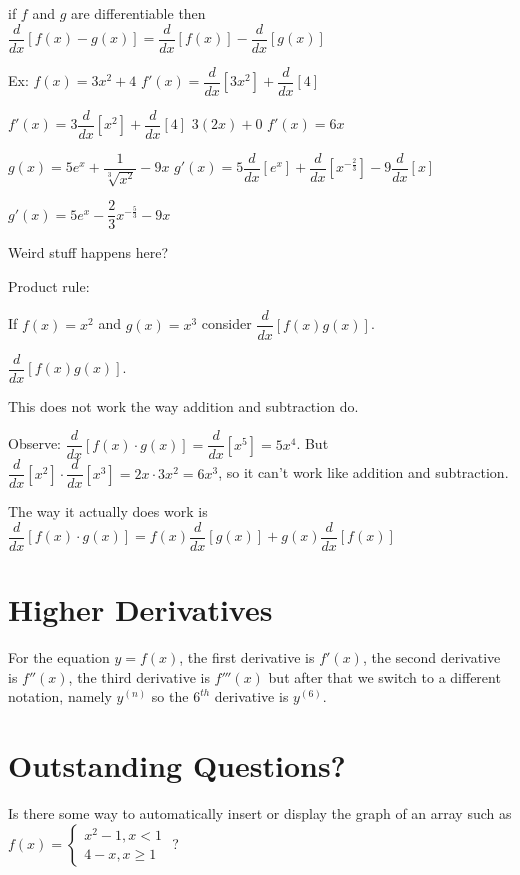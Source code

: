 \documentclass[12pt]{article}
\begin{document}
if $f$ and $g$ are differentiable then $\dfrac{d}{dx} \left[ f(x)-g(x) \right] =  \dfrac{d}{dx} \left[ f(x)
\right] - \dfrac{d}{dx} \left[ g(x) \right]$


Ex: $f(x) = 3x^{2}+4$
$f'(x) = \dfrac{d}{dx} \left[ 3x^{2} \right] + \dfrac{d}{dx} \left[ 4 \right] $

$f'(x) = 3\dfrac{d}{dx} \left[ x^{2} \right] + \dfrac{d}{dx} \left[ 4 \right] $
$3(2x)+0$
$f'(x) = 6x$

$g(x) = 5e^{x} +\dfrac{1}{\sqrt[3]{x^{2}}}-9x$
$g'(x) = 5\dfrac{d}{dx} \left[e^{x} \right] + \dfrac{d}{dx} \left[ x^{-\frac{2}{3}} \right] - 9 \dfrac{d}{dx}
\left[ x\right] $

$g'(x) = 5e^{x} - \dfrac{2}{3}x^{-\frac{5}{3}} - 9x$

Weird stuff happens here?


Product rule:

If $f(x) = x^{2}$ and $g(x)=x^{3}$ consider $\dfrac{d}{dx} \left[f(x)g(x) \right]$.

$\dfrac{d}{dx} \left[f(x)g(x) \right]$.

This does not work the way addition and subtraction do.

Observe: $\dfrac{d}{dx} \left[f(x) \cdot g(x) \right] = \dfrac{d}{dx} \left[x^{5} \right] = 5x^{4}$.
But $\dfrac{d}{dx} \left[x^{2} \right] \cdot \dfrac{d}{dx} \left[x^{3} \right] = 2x \cdot 3x^{2} = 6x^{3}$, so
it can't work like addition and subtraction.

The way it actually does work is $\dfrac{d}{dx} \left[f(x) \cdot g(x) \right] = f(x)\dfrac{d}{dx}\left[g(x) \right] + g(x)\dfrac{d}{dx}\left[f(x) \right]$


\section{Higher Derivatives}

For the equation $y=f(x)$, the first derivative is $f'(x)$, the second derivative is $f''(x)$, the third
derivative is $f'''(x)$ but after that we switch to a different notation, namely $y^{(n)}$
so the $6^{th}$ derivative is $y^{(6)}$.


\section{Outstanding Questions?}

Is there some way to automatically insert or display the graph of an array such as $f(x) = \left\{\begin{array}{l}
x^2-1,x < 1\\
4-x, x \geq 1
\end{array} \right. $ ?
\end{document}
